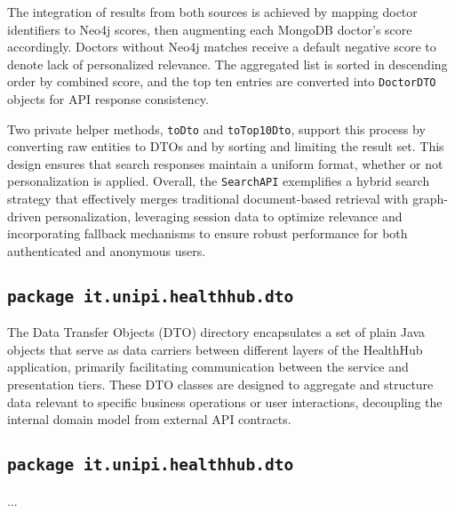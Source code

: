The integration of results from both sources is achieved by mapping doctor identifiers to Neo4j scores, then augmenting each MongoDB doctor's score accordingly. Doctors without Neo4j matches receive a default negative score to denote lack of personalized relevance. The aggregated list is sorted in descending order by combined score, and the top ten entries are converted into \texttt{DoctorDTO} objects for API response consistency.

Two private helper methods, \texttt{toDto} and \texttt{toTop10Dto}, support this process by converting raw entities to DTOs and by sorting and limiting the result set. This design ensures that search responses maintain a uniform format, whether or not personalization is applied. Overall, the \texttt{SearchAPI} exemplifies a hybrid search strategy that effectively merges traditional document-based retrieval with graph-driven personalization, leveraging session data to optimize relevance and incorporating fallback mechanisms to ensure robust performance for both authenticated and anonymous users.

\subsection{\texttt{package it.unipi.healthhub.dto}}
The Data Transfer Objects (DTO) directory encapsulates a set of plain Java objects that serve as data carriers between different layers of the HealthHub application, primarily facilitating communication between the service and presentation tiers. These DTO classes are designed to aggregate and structure data relevant to specific business operations or user interactions, decoupling the internal domain model from external API contracts.

\subsection{\texttt{package it.unipi.healthhub.dto}}

...

